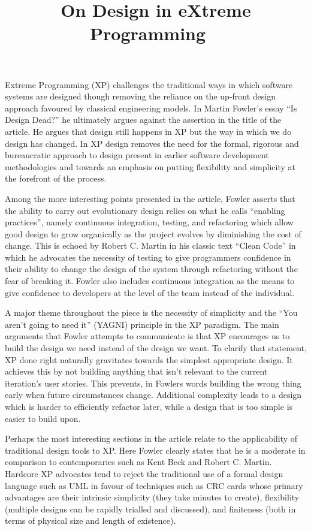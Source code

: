 \documentclass[paper=a4, fontsize=11pt]{scrartcl}	%
\title{
	\vspace{0in} 	\usefont{OT1}{bch}{b}{n}
	\huge \strut On Design in eXtreme Programming \
}
\author{}
\date{}
\numberwithin{equation}{section}															%
\numberwithin{figure}{section}																%
\numberwithin{table}{section}
\begin{document}
\maketitle
Extreme Programming (XP) challenges the traditional ways in which software systems are designed though removing the reliance on the up-front design approach favoured by classical engineering models. In Martin Fowler's essay ``Is Design Dead?'' \cite{fowler2004design} he ultimately argues against the assertion in the title of the article. He argues that design still happens in XP but the way in which we do design has changed. In XP design removes the need for the formal, rigorous and bureaucratic approach to design present in earlier software development methodologies and towards an emphasis on  putting flexibility and simplicity at the forefront of the process.

Among the more interesting points presented  in the article, Fowler asserts that the ability to carry out evolutionary design relies on what he calls ``enabling practices'', namely continuous integration, testing, and refactoring which allow good design to grow organically as the project evolves by diminishing the cost of change. This is echoed by Robert C. Martin in his classic text ``Clean Code'' \cite{martin2008clean} in which he advocates the necessity of testing to give programmers confidence in their ability to change the design of the system through refactoring without the fear of breaking it. Fowler also includes continuous integration as the means to give confidence to developers at the level of the team instead of the individual.

A major theme throughout the piece is the necessity of simplicity and the ``You aren't going to need it'' (YAGNI) principle in the XP paradigm. The main arguments that Fowler attempts to communicate is that XP encourages us to build the design we need instead of the design we want. To clarify that statement, XP done right naturally gravitates towards the simplest appropriate design. It achieves this by not building anything that isn't relevant to the current iteration's user stories. This prevents, in Fowlers words building the wrong thing early when future circumstances change. Additional complexity leads to a design which is harder to efficiently refactor later, while a design that is too simple is easier to build upon.

Perhaps the most interesting sections in the article relate to the applicability of traditional design tools to XP. Here Fowler clearly states that he is a moderate in comparison to contemporaries such as Kent Beck and Robert C. Martin. Hardcore XP advocates tend to  reject the traditional use of a formal design language such as UML in favour of techniques such as CRC cards \cite{wells1999crc} whose primary advantages are their intrinsic simplicity (they take minutes to create), flexibility (multiple designs can be rapidly trialled and discussed), and finiteness (both in terms of physical size and length of existence).
\end{document}
